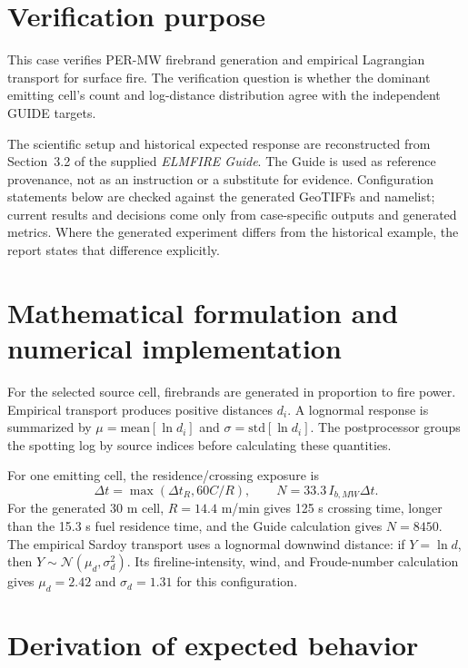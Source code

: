 \section{Verification purpose}

This case verifies PER-MW firebrand generation and empirical Lagrangian transport for surface fire.  The verification question is whether the dominant emitting cell's count and log-distance distribution agree with the independent GUIDE targets.

The scientific setup and historical expected response are reconstructed from Section~3.2 of the supplied \emph{ELMFIRE Guide}. The Guide is used as reference provenance, not as an instruction or a substitute for evidence. Configuration statements below are checked against the generated GeoTIFFs and namelist; current results and decisions come only from case-specific outputs and generated metrics. Where the generated experiment differs from the historical example, the report states that difference explicitly.

\section{Mathematical formulation and numerical implementation}

For the selected source cell, firebrands are generated in proportion to fire power. Empirical transport produces positive distances \(d_i\). A lognormal response is summarized by \(\mu=\mathrm{mean}[\ln d_i]\) and \(\sigma=\mathrm{std}[\ln d_i]\). The postprocessor groups the spotting log by source indices before calculating these quantities.

For one emitting cell, the residence/crossing exposure is
\begin{equation}
\Delta t=\max(\Delta t_R,60C/R), \qquad N=33.3\,I_{b,MW}\Delta t.
\end{equation}
For the generated 30 m cell, \(R=14.4\) m/min gives 125 s crossing time, longer than the 15.3 s fuel residence time, and the Guide calculation gives \(N=8450\). The empirical Sardoy transport uses a lognormal downwind distance: if \(Y=\ln d\), then \(Y\sim\mathcal{N}(\mu_d,\sigma_d^2)\). Its fireline-intensity, wind, and Froude-number calculation gives \(\mu_d=2.42\) and \(\sigma_d=1.31\) for this configuration.

\section{Derivation of expected behavior}

